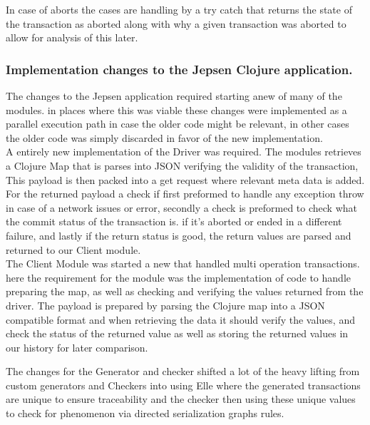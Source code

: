 \documentclass[a4paper,10pt,titlepage]{report}
\begin{document}
In case of aborts the cases are handling by a try catch that returns the state of the transaction as aborted along with why a given transaction was aborted to allow for analysis of this later.

     \subsubsection{Implementation changes to the Jepsen Clojure application.}


The changes to the Jepsen application required starting anew of many of the modules. in places where this was viable these changes were implemented as a parallel execution path in case the older code might be relevant, in other cases the older code was simply discarded in favor of the new implementation.
\\
\vspace{5mm}
A entirely new implementation of the Driver was required. The modules retrieves a Clojure Map that is parses into JSON verifying the validity of the transaction, This payload is then packed into a get request where relevant meta data is added. For the returned payload a check if first preformed to handle any exception throw in case of a network issues or error, secondly a check is preformed to check what the commit status of the transaction is. if it's aborted or ended in a different failure, and lastly if the return status is good, the return values are parsed and returned to our Client module.
\\
\vspace{5mm}
The Client Module was started a new that handled multi operation transactions. here the requirement for the module was the  implementation of code to handle preparing the map,  as well as checking and verifying the values returned from the driver. The payload is prepared by parsing the Clojure map into a JSON compatible format and when retrieving the data it should verify the values, and check the status of the returned value as well as storing the returned values in our history for later comparison.
\\
\vspace{5mm}
    
    The changes for the Generator and checker shifted a lot of the heavy lifting from custom generators and Checkers into using Elle where the generated transactions are unique to ensure traceability and the checker then using these unique values to check for phenomenon via directed serialization graphs rules.
    \\
    \vspace{5mm}
\end{document}
